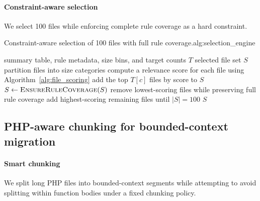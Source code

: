 \paragraph*{Constraint-aware selection}
We select 100 files while enforcing complete rule coverage as a hard constraint.

\begin{appalgorithm}{Constraint-aware selection of 100 files with full rule coverage.}{alg:selection_engine}
\begin{algorithmic}[1]
  \Require summary table, rule metadata, size bins, and target counts $T$
  \Ensure selected file set $S$
  \State partition files into size categories
  \State compute a relevance score for each file using Algorithm~\ref{alg:file_scoring}
    \State add the top $T[c]$ files by score to $S$
  \EndFor
  \State $S \gets \Call{EnsureRuleCoverage}{S}$
    \State remove lowest-scoring files while preserving full rule coverage
    \State add highest-scoring remaining files until $|S| = 100$
  \EndIf
  \State \Return $S$
\end{algorithmic}
\end{appalgorithm}

\subsection{PHP-aware chunking for bounded-context migration}
\label{app:chunking}

\paragraph*{Smart chunking}
We split long PHP files into bounded-context segments while attempting to avoid splitting within function bodies under a fixed chunking policy.

